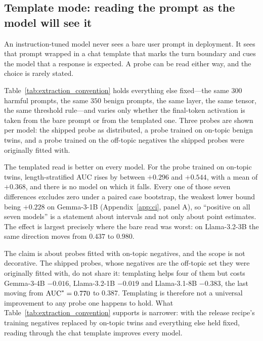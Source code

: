 \subsection{Template mode: reading the prompt as the model will see it}
\label{sec:template}

An instruction-tuned model never sees a bare user prompt in deployment. It sees that prompt wrapped in a chat
template that marks the turn boundary and cues the model that a response is expected. A probe can be read either way,
and the choice is rarely stated.

Table~\ref{tab:extraction_convention} holds everything else fixed---the same $300$ harmful prompts, the same $350$
benign prompts, the same layer, the same tensor, the same threshold rule---and varies only whether the final-token
activation is taken from the bare prompt or from the templated one. Three probes are shown per model: the shipped
probe as distributed, a probe trained on on-topic benign twins, and a probe trained on the off-topic negatives the
shipped probes were originally fitted with.



The templated read is better on every model. For the probe trained on on-topic twins, length-stratified AUC rises by
between $+0.296$ and $+0.544$, with a mean of $+0.368$, and there is no model on which it falls. Every one of those
seven differences excludes zero under a paired case bootstrap, the weakest lower bound being $+0.228$ on Gemma-3-1B
(Appendix~\ref{app:ci}, panel A), so ``positive on all seven models'' is a statement about intervals and not only
about point estimates. The effect is largest
precisely where the bare read was worst: on Llama-3.2-3B the same direction moves from $0.437$ to $0.980$.

The claim is about probes fitted with on-topic negatives, and the scope is not decorative. The shipped probes, whose
negatives are the off-topic set they were originally fitted with, do not share it: templating helps four of them but
costs Gemma-3-4B $-0.016$, Llama-3.2-1B $-0.019$ and Llama-3.1-8B $-0.383$, the last moving from $\text{AUC}^{*}{} = 0.770$
to $0.387$. Templating is therefore not a universal improvement to any probe one happens to hold. What
Table~\ref{tab:extraction_convention} supports is narrower: with the release recipe's training negatives replaced by
on-topic twins and everything else held fixed, reading through the chat template improves every model.

